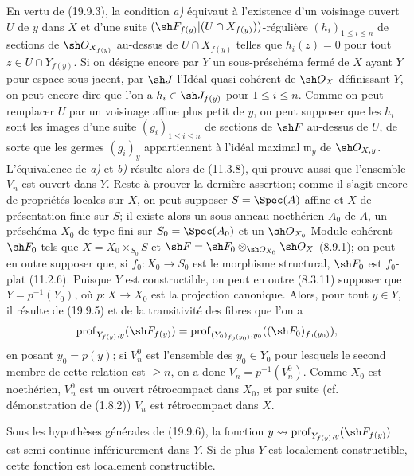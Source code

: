 En vertu de (19.9.3), la condition \emph{a)} équivaut à l'existence d'un voisinage ouvert $U$ de $y$ dans $X$ et d'une suite $(\sh F_{f(y)}|(U\cap X_{f(y)}))$-régulière $(h_i)_{1\leq i\leq n}$ de sections de $\sh O_{X_{f(y)}}$ au-dessus de $U\cap X_{f(y)}$ telles que $h_i(z)=0$ pour tout $z\in U\cap Y_{f(y)}$. Si on désigne encore par $Y$ un sous-préschéma fermé de $X$ ayant $Y$ pour espace sous-jacent, par $\sh J$ l'Idéal quasi-cohérent de $\sh O_X$ définissant $Y$, on peut encore dire que l'on a $h_i\in\sh J_{f(y)}$ pour $1\leq i\leq n$. Comme on peut remplacer $U$ par un voisinage affine plus petit de $y$, on peut supposer que les $h_i$ sont les images d'une suite $(g_i)_{1\leq i\leq n}$ de sections de $\sh F$ au-dessus de $U$, de sorte que les germes $(g_i)_y$ appartiennent à l'idéal maximal $\mathfrak m_y$ de $\sh O_{X,y}$. L'équivalence de \emph{a)} et \emph{b)} résulte alors de (11.3.8), qui prouve aussi que l'ensemble $V_n$ est ouvert dans $Y$.
Reste à prouver la dernière assertion; comme il s'agit encore de propriétés locales sur $X$, on peut supposer $S=\Spec(A)$ affine et $X$ de présentation finie sur $S$; il existe alors un sous-anneau noethérien $A_0$ de $A$, un préschéma $X_0$ de type fini sur $S_0=\Spec(A_0)$ et un $\sh O_{X_0}$-Module cohérent $\sh F_0$ tels que $X=X_0\times_{S_0}S$ et $\sh F=\sh F_0\otimes_{\sh O_{X_0}}\sh O_X$ (8.9.1); on peut en outre supposer que, si $f_0:X_0\to S_0$ est le morphisme structural, $\sh F_0$ est $f_0$-plat (11.2.6). Puisque $Y$ est constructible, on peut en outre (8.3.11) supposer
que $Y=p^{-1}(Y_0)$, où $p:X\to X_0$ est la projection canonique. Alors, pour tout $y\in Y$, il résulte de (19.9.5) et de la transitivité des fibres que l'on a
\[
  \operatorname{prof}_{Y_{f(y)},y}(\sh F_{f(y)})
  =\operatorname{prof}_{(Y_0)_{f_0(y_0)},y_0}((\sh F_0)_{f_0(y_0)}),
\]
en posant $y_0=p(y)$; si $V_n^0$ est l'ensemble des $y_0\in Y_0$ pour lesquels le second membre de cette relation est $\geq n$, on a donc $V_n=p^{-1}(V_n^0)$. Comme $X_0$ est noethérien, $V_n^0$ est un ouvert rétrocompact dans $X_0$, et par suite (cf. démonstration de (1.8.2)) $V_n$ est rétrocompact dans $X$.

\begin{corollary}[19.9.7]
\label{IV.19.9.7}
Sous les hypothèses générales de \textup{(19.9.6)}, la fonction $y\leadsto\operatorname{prof}_{Y_{f(y)},y}(\sh F_{f(y)})$ est semi-continue inférieurement dans $Y$. Si de plus $Y$ est localement constructible, cette fonction est localement constructible.
\end{corollary}

